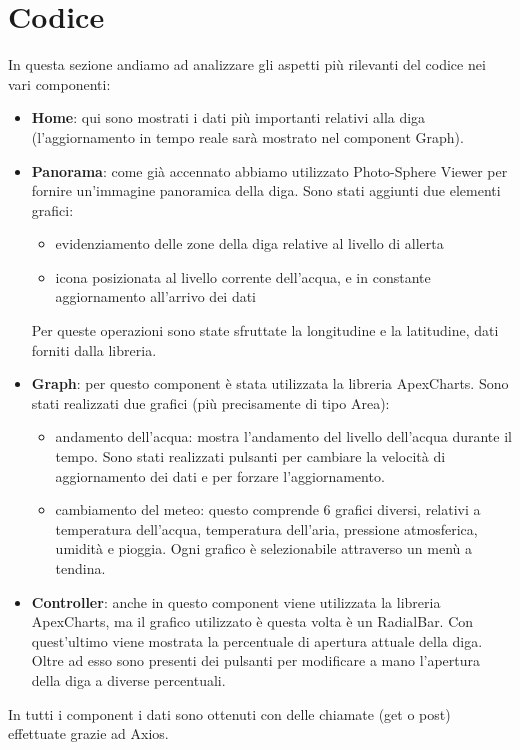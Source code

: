 \documentclass{article}
\begin{document}
\section{Codice}
In questa sezione andiamo ad analizzare gli aspetti più rilevanti del codice nei vari componenti:
\begin{itemize}
    \item \textbf{Home}: qui sono mostrati i dati più importanti relativi alla diga (l'aggiornamento in tempo reale sarà mostrato nel component Graph).
	\item \textbf{Panorama}: come già accennato abbiamo utilizzato Photo-Sphere Viewer per fornire un'immagine panoramica della diga. Sono stati aggiunti due elementi grafici:
    	\begin{itemize}
    	    \item evidenziamento delle zone della diga relative al livello di allerta
    	    \item icona posizionata al livello corrente dell'acqua, e in constante aggiornamento all'arrivo dei dati
    	\end{itemize}
	Per queste operazioni sono state sfruttate la longitudine e la latitudine, dati forniti dalla libreria.
	\item \textbf{Graph}: per questo component è stata utilizzata la libreria ApexCharts. Sono stati realizzati due grafici (più precisamente di tipo Area):
	\begin{itemize}
	    \item andamento dell'acqua: mostra l'andamento del livello dell'acqua durante il tempo. Sono stati realizzati pulsanti per cambiare la velocità di aggiornamento dei dati e per forzare l'aggiornamento.
	    \item cambiamento del meteo:  questo comprende 6 grafici diversi, relativi a temperatura dell'acqua, temperatura dell'aria, pressione atmosferica, umidità e pioggia. Ogni grafico è selezionabile attraverso un menù a tendina.
	\end{itemize}
	\item \textbf{Controller}: anche in questo component viene utilizzata la libreria ApexCharts, ma il grafico utilizzato è questa volta è un RadialBar. Con quest'ultimo viene mostrata la percentuale di apertura attuale della diga. Oltre ad esso sono presenti dei pulsanti per modificare a mano l'apertura della diga a diverse percentuali.
\end{itemize}
In tutti i component i dati sono ottenuti con delle chiamate (get o post) effettuate grazie ad Axios.
\end{document}
